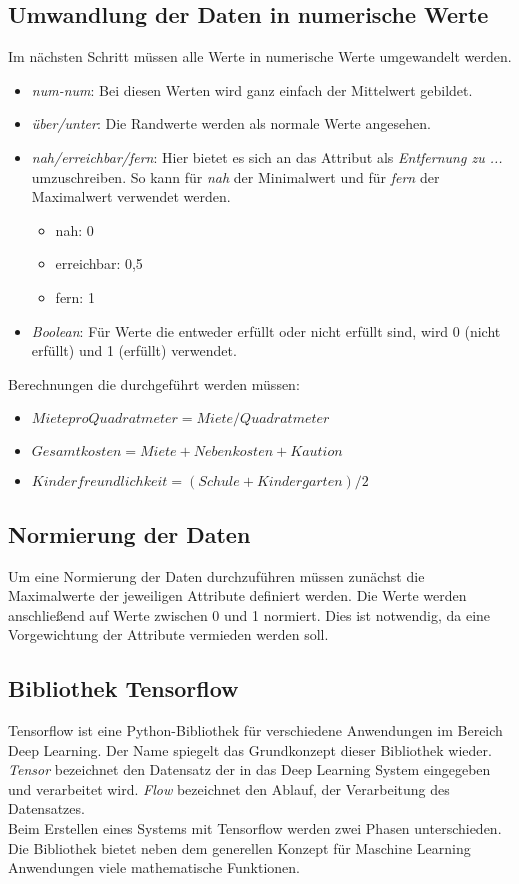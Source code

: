 \subsection{Umwandlung der Daten in numerische Werte}
Im nächsten Schritt müssen alle Werte in numerische Werte umgewandelt werden. 
\begin{itemize}
    \item \textit{num-num}: Bei diesen Werten wird ganz einfach der Mittelwert gebildet. 
    \item \textit{über/unter}: Die Randwerte werden als normale Werte angesehen. 
    \item \textit{nah/erreichbar/fern}: Hier bietet es sich an das Attribut als \textit{Entfernung zu ...} umzuschreiben. 
                So kann für \textit{nah} der Minimalwert und für \textit{fern} der Maximalwert verwendet werden.
    \begin{itemize}
        \item nah: 0
        \item erreichbar: 0,5
        \item fern: 1
    \end{itemize}
    \item \textit{Boolean}: Für Werte die entweder erfüllt oder nicht erfüllt sind, wird 0 (nicht erfüllt) und 1 (erfüllt) verwendet.
\end{itemize}

Berechnungen die durchgeführt werden müssen: 
\begin{itemize}
    \item $Miete pro Quadratmeter = Miete/Quadratmeter$
    \item $Gesamtkosten = Miete + Nebenkosten + Kaution$
    \item $Kinderfreundlichkeit = (Schule + Kindergarten)/2$
\end{itemize}

\subsection{Normierung der Daten}
Um eine Normierung der Daten durchzuführen müssen zunächst die Maximalwerte der 
jeweiligen Attribute definiert werden. Die Werte werden anschließend auf Werte 
zwischen 0 und 1 normiert. Dies ist notwendig, da eine Vorgewichtung der Attribute
vermieden werden soll.

\subsection{Bibliothek Tensorflow}
Tensorflow ist eine Python-Bibliothek für verschiedene Anwendungen im Bereich Deep Learning. 
Der Name spiegelt das Grundkonzept dieser Bibliothek wieder. 
\textit{Tensor} bezeichnet den Datensatz der in das Deep Learning System 
eingegeben und verarbeitet wird. \textit{Flow} bezeichnet den Ablauf, 
der Verarbeitung des Datensatzes. \\
Beim Erstellen eines Systems mit Tensorflow werden zwei Phasen 
unterschieden. 
Die Bibliothek bietet neben dem generellen Konzept für Maschine Learning Anwendungen 
viele mathematische Funktionen. 
\cite{tf:2018}

